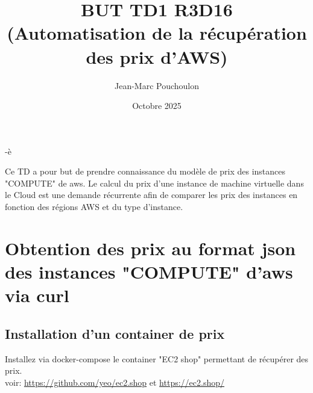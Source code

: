 
\graphicspath{{images/}{./images/}}

\usepackage{minted}
\usepackage{hyperref}

\title{BUT TD1 R3D16\\ 
(Automatisation de la récupération des prix d'AWS)}
\date{Octobre 2025} %
\author{Jean-Marc Pouchoulon}
\noprintanswers

-è
\maketitle
Ce TD a pour but de prendre connaissance du modèle de prix des instances "COMPUTE" de aws.
Le calcul du prix d'une instance de machine virtuelle dans le Cloud est une demande récurrente afin de comparer les prix des instances 
en fonction des régions AWS et du type d'instance.  


\section{Obtention des prix au format json des instances "COMPUTE" d'aws via curl}

\subsection{Installation d'un container de prix}


Installez via docker-compose le container "EC2 shop"  permettant de récupérer des prix.
\\
voir: \url{https://github.com/yeo/ec2.shop} et \url{https://ec2.shop/}


